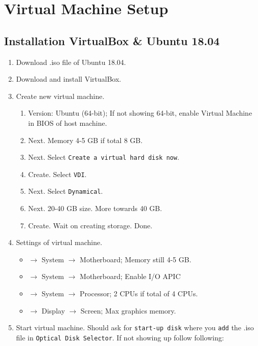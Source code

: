 \section{Virtual Machine Setup}
\subsection{Installation VirtualBox \& Ubuntu 18.04}

\begin{enumerate}
    \item Download .iso file of Ubuntu 18.04.
    \item Download and install VirtualBox.
    \item Create new virtual machine.
        \begin{enumerate}
            \item Version: Ubuntu (64-bit); If not showing 64-bit, enable Virtual Machine in BIOS of host machine.
            \item Next. Memory 4-5 GB if total 8 GB.
            \item Next. Select \texttt{Create a virtual hard disk now}.
            \item Create. Select \texttt{VDI}.
            \item Next. Select \texttt{Dynamical}.
            \item Next. 20-40 GB size. More towards 40 GB.
            \item Create. Wait on creating storage. Done.
        \end{enumerate}
    \item Settings of virtual machine.
        \begin{itemize}
            \item \(\rightarrow\) System \(\rightarrow\) Motherboard; Memory still 4-5 GB.
            \item \(\rightarrow\) System \(\rightarrow\) Motherboard; Enable I/O APIC
            \item \(\rightarrow\) System \(\rightarrow\) Processor; 2 CPUs if total of 4 CPUs.
            \item \(\rightarrow\) Display \(\rightarrow\) Screen; Max graphics memory.
        \end{itemize}
    \item Start virtual machine. Should ask for \texttt{start-up disk} where you \texttt{add} the .iso file in \texttt{Optical Disk Selector}. If not showing up follow following:
        \begin{enumerate}

\end{enumerate}
\end{enumerate}
